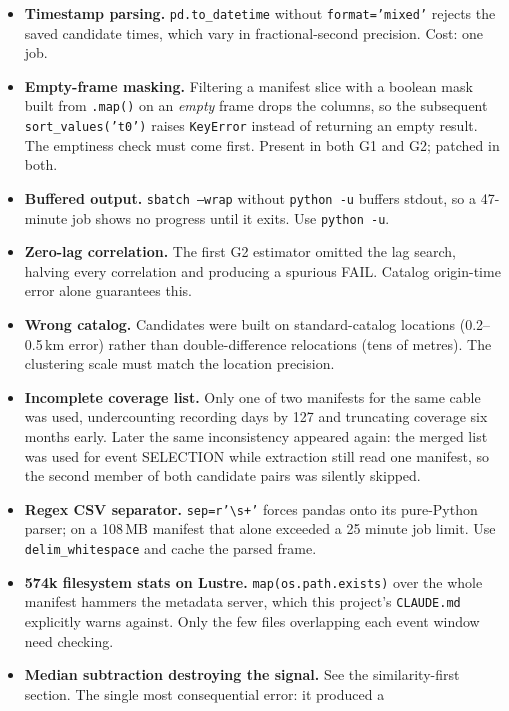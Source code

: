 \documentclass[11pt]{article}
\begin{document}
\begin{itemize}[leftmargin=*]
  \item \textbf{Timestamp parsing.} \texttt{pd.to\_datetime} without
  \texttt{format='mixed'} rejects the saved candidate times, which vary in
  fractional-second precision. Cost: one job.
  \item \textbf{Empty-frame masking.} Filtering a manifest slice with a boolean
  mask built from \texttt{.map()} on an \emph{empty} frame drops the columns, so
  the subsequent \texttt{sort\_values('t0')} raises \texttt{KeyError} instead of
  returning an empty result. The emptiness check must come first. Present in
  both G1 and G2; patched in both.
  \item \textbf{Buffered output.} \texttt{sbatch --wrap} without \texttt{python
  -u} buffers stdout, so a 47-minute job shows no progress until it exits. Use
  \texttt{python -u}.
  \item \textbf{Zero-lag correlation.} The first G2 estimator omitted the lag
  search, halving every correlation and producing a spurious FAIL. Catalog
  origin-time error alone guarantees this.
  \item \textbf{Wrong catalog.} Candidates were built on standard-catalog
  locations (0.2--0.5\,km error) rather than double-difference relocations
  (tens of metres). The clustering scale must match the location precision.
  \item \textbf{Incomplete coverage list.} Only one of two manifests for the same
  cable was used, undercounting recording days by 127 and truncating coverage six
  months early. Later the same inconsistency appeared again: the merged list was
  used for event SELECTION while extraction still read one manifest, so the second
  member of both candidate pairs was silently skipped.
  \item \textbf{Regex CSV separator.} \texttt{sep=r'\textbackslash s+'} forces
  pandas onto its pure-Python parser; on a 108\,MB manifest that alone exceeded a
  25 minute job limit. Use \texttt{delim\_whitespace} and cache the parsed frame.
  \item \textbf{574k filesystem stats on Lustre.} \texttt{map(os.path.exists)} over
  the whole manifest hammers the metadata server, which this project's
  \texttt{CLAUDE.md} explicitly warns against. Only the few files overlapping each
  event window need checking.
  \item \textbf{Median subtraction destroying the signal.} See the
  similarity-first section. The single most consequential error: it produced a

\end{itemize}
\end{document}
